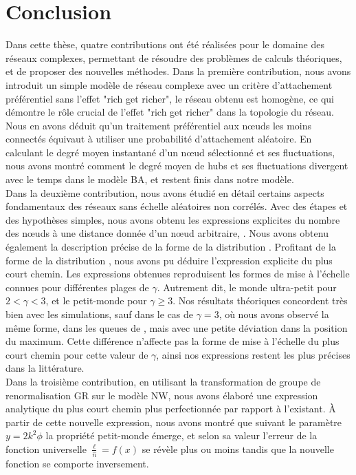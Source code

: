 
\chapter*{Conclusion}
 


Dans cette thèse, quatre contributions ont été réalisées pour le domaine des réseaux complexes, permettant de résoudre des problèmes de calculs théoriques, et de proposer des nouvelles méthodes. Dans la première contribution, nous avons introduit un simple modèle de réseau complexe avec un critère d'attachement préférentiel sans l'effet "rich get richer", le réseau obtenu est homogène, ce qui démontre le rôle crucial de l'effet "rich get richer" dans la topologie du réseau. Nous en avons déduit qu'un traitement préférentiel aux nœuds les moins connectés équivaut à utiliser une probabilité d'attachement aléatoire. En calculant le degré moyen instantané d'un nœud sélectionné et ses fluctuations, nous avons montré comment le degré moyen de hubs et ses fluctuations divergent avec le temps dans le modèle BA, et restent finis dans notre modèle.\\
Dans la deuxième contribution, nous avons étudié en détail certains aspects fondamentaux des réseaux sans échelle aléatoires non corrélés. Avec des étapes et des hypothèses simples, nous avons obtenu les expressions explicites du nombre des nœuds à une distance donnée d'un nœud arbitraire, \nl\nolinebreak. Nous avons obtenu également la description précise de la forme de la distribution \nolinebreak. Profitant de la forme de la distribution \nl, nous avons pu déduire l'expression explicite du plus court chemin. Les expressions obtenues reproduisent les formes de mise à l'échelle connues pour différentes plages de $\gamma$. Autrement dit, le monde ultra-petit pour $2<\gamma<3$, et le petit-monde pour $\gamma\ge 3$. Nos résultats théoriques concordent très bien avec les simulations, sauf dans le cas de $\gamma=3$, où nous avons observé la même forme, dans les queues de \nl, mais avec une petite déviation dans la position du maximum. Cette différence n'affecte pas la forme de mise à l'échelle du plus court chemin pour cette valeur de $\gamma$, ainsi nos expressions restent les plus précises dans la littérature.\\
Dans la troisième contribution, en utilisant la transformation de groupe de renormalisation GR sur le modèle NW, nous avons élaboré une expression analytique du plus court chemin plus perfectionnée par rapport à l'existant. \`{A} partir de cette nouvelle expression, nous avons montré  que suivant le paramètre $y=2k^2\phi$ la propriété petit-monde émerge, et selon sa valeur l'erreur de la fonction universelle $\frac{\ell}{\hat n}=f(x)$ se révèle  plus ou moins tandis que la nouvelle fonction se comporte inversement.\\
